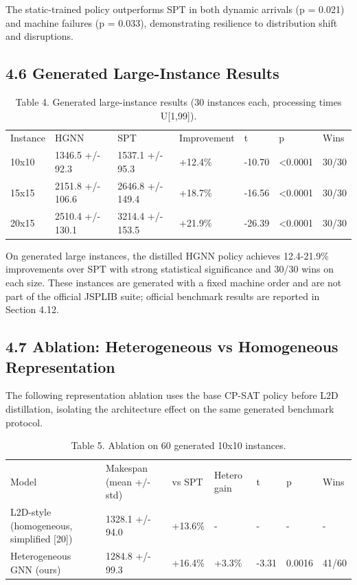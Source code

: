 \documentclass{article}
\begin{document}
The static-trained policy outperforms SPT in both dynamic arrivals (p = 0.021) and machine failures (p = 0.033), demonstrating resilience to distribution shift and disruptions.


\subsection*{4.6 Generated Large-Instance Results}

\begin{table}[h]
\centering
\begin{tabular}{lllllll}
\toprule
Instance & HGNN & SPT & Improvement & t & p & Wins \\
10x10 & 1346.5 +/- 92.3 & 1537.1 +/- 95.3 & +12.4\% & -10.70 & <0.0001 & 30/30 \\
15x15 & 2151.8 +/- 106.6 & 2646.8 +/- 149.4 & +18.7\% & -16.56 & <0.0001 & 30/30 \\
20x15 & 2510.4 +/- 130.1 & 3214.4 +/- 153.5 & +21.9\% & -26.39 & <0.0001 & 30/30 \\
\bottomrule
\end{tabular}
\caption{Table 4. Generated large-instance results (30 instances each, processing times U{[}1,99{]}).}
\end{table}

On generated large instances, the distilled HGNN policy achieves 12.4-21.9\% improvements over SPT with strong statistical significance and 30/30 wins on each size. These instances are generated with a fixed machine order and are not part of the official JSPLIB suite; official benchmark results are reported in Section 4.12.


\subsection*{4.7 Ablation: Heterogeneous vs Homogeneous Representation}

The following representation ablation uses the base CP-SAT policy before L2D distillation, isolating the architecture effect on the same generated benchmark protocol.

\begin{table}[h]
\centering
\begin{tabular}{lllllll}
\toprule
Model & Makespan (mean +/- std) & vs SPT & Hetero gain & t & p & Wins \\
L2D-style (homogeneous, simplified {[}20{]}) & 1328.1 +/- 94.0 & +13.6\% & - & - & - & - \\
Heterogeneous GNN (ours) & 1284.8 +/- 99.3 & +16.4\% & +3.3\% & -3.31 & 0.0016 & 41/60 \\
\bottomrule
\end{tabular}
\caption{Table 5. Ablation on 60 generated 10x10 instances.}
\end{table}
\end{document}

